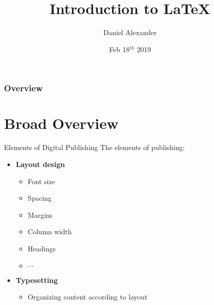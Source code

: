 \documentclass{beamer}
\title[\LaTeX]{Introduction to \LaTeX} %
\author{Daniel Alexander} %
\institute[CISER] %
{
CISER, Cornell University \\ %
\medskip
\textit{dra65@cornell.edu} %
}
\date{Feb 18$^{th}$ 2019} %
\begin{document}
\begin{frame}
\titlepage %
\end{frame}

\begin{frame}
\frametitle{Overview} %
\tableofcontents %
\end{frame}


\section{Broad Overview} 
\begin{frame}{Elements of Digital Publishing}
 The elements of publishing:
 \begin{itemize}
 \item \textbf{Layout design}
 \begin{itemize}
  \item Font size
  \item Spacing
  \item Margins
  \item Column width
  \item Headings
  \item $\cdots$
 \end{itemize}
 \item \textbf{Typesetting}
 \begin{itemize}
  \item Organizing content according to layout
 \end{itemize}
\end{itemize}
\end{frame}
\end{document}
